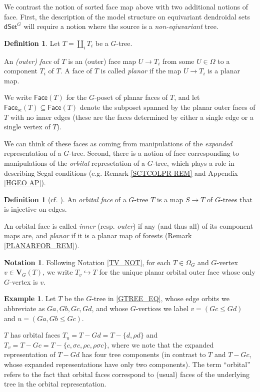 \documentclass[a4paper,10pt
,draft
]{article}%
\numberwithin{equation}{section}
\numberwithin{figure}{section}
\theoremstyle{definition} %
\newtheorem{definition}[equation]{Definition}%
\newtheorem{example}[equation]{Example}%
\newtheorem{notation}[equation]{Notation}%
\newcommand{\1}{\ensuremath{\mathbbm 1}}%
\begin{document}
We contrast the notion of sorted face map above
with two additional notions of face.
First, 
the description of the model structure
on equivariant dendroidal sets $\mathsf{dSet}^G$
will require a notion where the source is a \textit{non-eqiuvariant} tree.
\begin{definition}
	Let $T = \amalg_i T_i$ be a $G$-tree.
	
	An \textit{(outer) face} of $T$ is an (outer) face map 
	$U \to T_i$ from some $U \in \Omega$ to a component $T_i$ of $T$.
	A face of $T$ is called \textit{planar} if the map $U \to T_i$ is a planar map.

	We write $\mathsf{Face}(T)$ for the $G$-poset of planar faces of $T$,
	and let $\mathsf{Face}_{\mathsf{sc}}(T) \subseteq \mathsf{Face}(T)$ denote the subposet spanned by the planar outer faces of $T$ with no inner edges
	(these are the faces determined by either a single edge or a single vertex of $T$).
\end{definition}

We can think of these faces as coming from manipulations of the \textit{expanded} representation of a $G$-tree.
Second, there is a notion of face corresponding to manipulations of the \textit{orbital} represetation of a $G$-tree,
which plays a role in describing Segal conditions (e.g. Remark \ref{SCTCOLPR REM} and Appendix \ref{HGEO AP}).

\begin{definition}[{cf. \cite[Def. 2.16]{BP_edss}}]
        \label{ORBITALFACE_DEF}
	An \textit{orbital face} of a $G$-tree $T$ is
        a map $S \to T$ of $G$-trees
	that is injective on edges.

        An orbital face is called
	\textit{inner} (resp. \textit{outer}) if any (and thus all) of its component maps are,
        and \textit{planar} if it is a planar map of forests (Remark \ref{PLANARFOR_REM}).
\end{definition}

\begin{notation}
        \label{TVG_NOT}
        Following Notation \ref{TV_NOT}, 
        for each $T \in \Omega_G$ and $G$-vertex $v \in \boldsymbol{V}_G(T)$, we write 
        $T_v \hookrightarrow T$ for the unique planar orbital outer face whose only
        $G$-vertex is $v$.
\end{notation}

\begin{example}\label{ORBFACE EQ}
	Let $T$ be the $G$-tree in \eqref{GTREE_EQ},
	whose edge orbits we abbreviate as $Ga,Gb,Gc,Gd$,
        and whose $G$-vertices we label $v = (Gc \leq Gd)$ and $u = (Ga, Gb \leq Gc)$. 
	
	$T$ has orbital faces
	$T_u = T-Gd = T-\{d,\rho d\}$
	and 
	$T_v = T-Gc = T-\{c,\sigma c, \rho c, \rho \sigma c\}$,
	where we note that the expanded representation of
	$T-Gd$ has four tree components
	(in contrast to $T$ and $T-Gc$, whose expanded representations have only two components).
	The term ``orbital'' refers to the fact that orbital faces 
	correspond to (usual) faces of the underlying tree in the orbital representation.        
\end{example}
\end{document}
